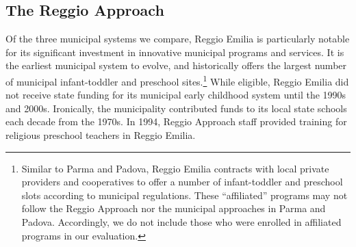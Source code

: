 

\subsection{The Reggio Approach}

Of the three municipal systems we compare, Reggio Emilia is particularly notable for its significant investment in innovative municipal programs and services. It is the earliest municipal system to evolve, and historically offers the largest number of municipal infant-toddler and preschool sites.\footnote{Similar to Parma and Padova, Reggio Emilia contracts with local private providers and cooperatives to offer a number of infant-toddler and preschool slots according to municipal regulations. These ``affiliated'' programs may not follow the Reggio Approach nor the municipal approaches in Parma and Padova. Accordingly, we do not include those who were enrolled in affiliated programs in our evaluation.} While eligible, Reggio Emilia did not receive state funding for its municipal early childhood system until the 1990s and 2000s. Ironically, the municipality contributed funds to its local state schools each decade from the 1970s. In 1994, Reggio Approach staff provided training for religious preschool teachers in Reggio Emilia. 

